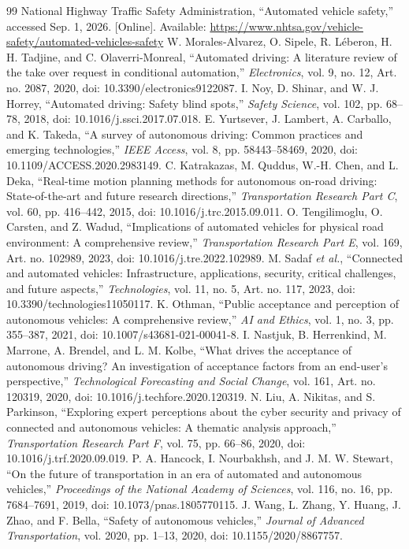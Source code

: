 \documentclass[conference]{../../../../Conference-LaTeX-template_10-17-19/IEEEtran}
\begin{document}
\begin{thebibliography}{99}
 National Highway Traffic Safety Administration, ``Automated vehicle safety,'' accessed Sep. 1, 2026. [Online]. Available: \url{https://www.nhtsa.gov/vehicle-safety/automated-vehicles-safety}
 W. Morales-Alvarez, O. Sipele, R. L\'eberon, H. H. Tadjine, and C. Olaverri-Monreal, ``Automated driving: A literature review of the take over request in conditional automation,'' \emph{Electronics}, vol. 9, no. 12, Art. no. 2087, 2020, doi: 10.3390/electronics9122087.
 I. Noy, D. Shinar, and W. J. Horrey, ``Automated driving: Safety blind spots,'' \emph{Safety Science}, vol. 102, pp. 68--78, 2018, doi: 10.1016/j.ssci.2017.07.018.
 E. Yurtsever, J. Lambert, A. Carballo, and K. Takeda, ``A survey of autonomous driving: Common practices and emerging technologies,'' \emph{IEEE Access}, vol. 8, pp. 58443--58469, 2020, doi: 10.1109/ACCESS.2020.2983149.
 C. Katrakazas, M. Quddus, W.-H. Chen, and L. Deka, ``Real-time motion planning methods for autonomous on-road driving: State-of-the-art and future research directions,'' \emph{Transportation Research Part C}, vol. 60, pp. 416--442, 2015, doi: 10.1016/j.trc.2015.09.011.
 O. Tengilimoglu, O. Carsten, and Z. Wadud, ``Implications of automated vehicles for physical road environment: A comprehensive review,'' \emph{Transportation Research Part E}, vol. 169, Art. no. 102989, 2023, doi: 10.1016/j.tre.2022.102989.
 M. Sadaf \emph{et al.}, ``Connected and automated vehicles: Infrastructure, applications, security, critical challenges, and future aspects,'' \emph{Technologies}, vol. 11, no. 5, Art. no. 117, 2023, doi: 10.3390/technologies11050117.
 K. Othman, ``Public acceptance and perception of autonomous vehicles: A comprehensive review,'' \emph{AI and Ethics}, vol. 1, no. 3, pp. 355--387, 2021, doi: 10.1007/s43681-021-00041-8.
 I. Nastjuk, B. Herrenkind, M. Marrone, A. Brendel, and L. M. Kolbe, ``What drives the acceptance of autonomous driving? An investigation of acceptance factors from an end-user's perspective,'' \emph{Technological Forecasting and Social Change}, vol. 161, Art. no. 120319, 2020, doi: 10.1016/j.techfore.2020.120319.
 N. Liu, A. Nikitas, and S. Parkinson, ``Exploring expert perceptions about the cyber security and privacy of connected and autonomous vehicles: A thematic analysis approach,'' \emph{Transportation Research Part F}, vol. 75, pp. 66--86, 2020, doi: 10.1016/j.trf.2020.09.019.
 P. A. Hancock, I. Nourbakhsh, and J. M. W. Stewart, ``On the future of transportation in an era of automated and autonomous vehicles,'' \emph{Proceedings of the National Academy of Sciences}, vol. 116, no. 16, pp. 7684--7691, 2019, doi: 10.1073/pnas.1805770115.
 J. Wang, L. Zhang, Y. Huang, J. Zhao, and F. Bella, ``Safety of autonomous vehicles,'' \emph{Journal of Advanced Transportation}, vol. 2020, pp. 1--13, 2020, doi: 10.1155/2020/8867757.
\end{thebibliography}
\end{document}
